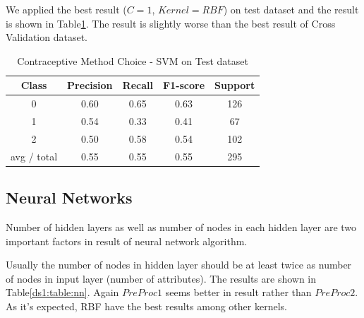 We applied the best result ($C=1$, $Kernel=RBF$) on test dataset and the result is shown in Table\ref{ds1:table:svm-test}. The result is slightly worse than the best result of Cross Validation dataset.


\begin{table}[p]
\begin{center}
\begin{tabular}{|c|c|c|c|c|}
\hline Class & Precision & Recall & F1-score & Support \\

\hline 0 & 0.60 & 0.65 & 0.63 & 126\\
\hline 1 & 0.54 & 0.33 & 0.41 & 67\\
\hline 2 & 0.50 & 0.58 & 0.54 & 102\\
\hline avg / total & 0.55 & 0.55 & 0.55 & 295\\
\hline
\end{tabular}

\caption{Contraceptive Method Choice - SVM on Test dataset}
\label{ds1:table:svm-test}
\end{center}
\end{table}


\subsection{Neural Networks}
Number of hidden layers as well as number of nodes in each hidden layer are two important factors in result of neural network algorithm. 

Usually the number of nodes in hidden layer should be at least twice as number of nodes in input layer (number of attributes). The results are shown in Table\ref{ds1:table:nn}. Again $PreProc1$ seems better in result rather than $PreProc2$. As it's expected, RBF have the best results among other kernels.


